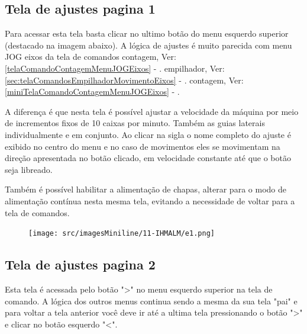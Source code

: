 \newpage
\thispagestyle{fancy}
\vspace*{40 pt}
\subsection{Tela de ajustes pagina 1}\label{miniIhmAlimentacaoTelaAjustesPagina1}

Para acessar esta tela basta clicar no ultimo botão do menu esquerdo superior (destacado na imagem abaixo). 
A lógica de ajustes é muito parecida com menu JOG eixos da tela de comandos 
\ifmachineTypeFlexo
contagem, Ver: \ref{telaComandoContagemMenuJOGEixos} - .
\fi
\ifmachineTypeIcv
empilhador, Ver: \ref{sec:telaComandosEmpilhadorMovimentoEixos} - .
\fi
\ifmachineTypeMiniline
contagem, Ver: \ref{miniTelaComandoContagemMenuJOGEixos} - .
\fi

A diferença é que nesta tela é possível ajustar a velocidade da máquina por meio
de incrementos fixos de 10 caixas por minuto. Também as guias laterais individualmente e em conjunto.
Ao clicar na sigla o nome completo do ajuste é exibido no centro do menu e no caso de movimentos eles se movimentam na direção apresentada no botão clicado,
em velocidade constante até que o botão seja libreado.

Também é possível habilitar a alimentação de chapas, alterar para o modo de alimentação contínua nesta mesma tela, evitando a necessidade de voltar para a tela de comandos.

\vspace*{\fill}
\begin{figure}[h]
  \centering
  \texttt{[image: src/imagesMiniline/11-IHMALM/e1.png]}
\end{figure}
\vspace*{\fill}

\newpage
\thispagestyle{fancy}
\vspace*{40 pt}
\subsection{Tela de ajustes pagina 2}\label{miniIelaAjustes2}

Esta tela é acessada pelo botão "\textgreater" no menu esquerdo superior na tela de comando. A lógica dos outros menus continua sendo a mesma da sua tela "pai" e para voltar a tela anterior você deve ir até a ultima tela pressionando o botão "\textgreater{}" e clicar no botão esquerdo "\textless{}".

